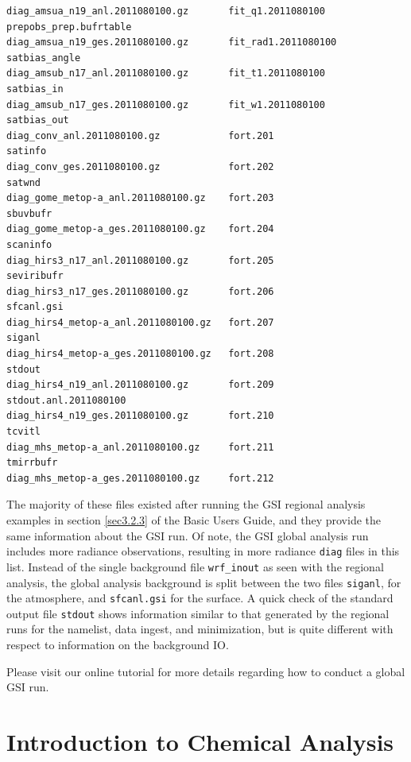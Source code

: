 \begin{scriptsize}
\begin{verbatim}
diag_amsua_n19_anl.2011080100.gz       fit_q1.2011080100                    prepobs_prep.bufrtable
diag_amsua_n19_ges.2011080100.gz       fit_rad1.2011080100                  satbias_angle
diag_amsub_n17_anl.2011080100.gz       fit_t1.2011080100                    satbias_in
diag_amsub_n17_ges.2011080100.gz       fit_w1.2011080100                    satbias_out
diag_conv_anl.2011080100.gz            fort.201                             satinfo
diag_conv_ges.2011080100.gz            fort.202                             satwnd
diag_gome_metop-a_anl.2011080100.gz    fort.203                             sbuvbufr
diag_gome_metop-a_ges.2011080100.gz    fort.204                             scaninfo
diag_hirs3_n17_anl.2011080100.gz       fort.205                             seviribufr
diag_hirs3_n17_ges.2011080100.gz       fort.206                             sfcanl.gsi
diag_hirs4_metop-a_anl.2011080100.gz   fort.207                             siganl
diag_hirs4_metop-a_ges.2011080100.gz   fort.208                             stdout
diag_hirs4_n19_anl.2011080100.gz       fort.209                             stdout.anl.2011080100
diag_hirs4_n19_ges.2011080100.gz       fort.210                             tcvitl
diag_mhs_metop-a_anl.2011080100.gz     fort.211                             tmirrbufr
diag_mhs_metop-a_ges.2011080100.gz     fort.212
\end{verbatim}
\end{scriptsize}

The majority of these files existed after running the GSI regional analysis examples in section \ref{sec3.2.3} of the Basic User\textquotesingle s 
Guide, and they provide the same information about the GSI run. Of note, the GSI global analysis run includes more radiance observations, resulting 
in more radiance \verb|diag| files in this list. Instead of the single background file \verb|wrf_inout| as seen with the regional analysis, the global analysis background is split between the two files \verb|siganl|, for the atmosphere, and \verb|sfcanl.gsi| for the surface. A quick check of the standard output file 
\verb|stdout| shows information similar to that generated by the regional runs for the namelist, data ingest, and minimization, but is quite different with respect to information on the background IO.

Please visit our online tutorial for more details regarding how to conduct a global GSI run.

\section{Introduction to Chemical Analysis}

